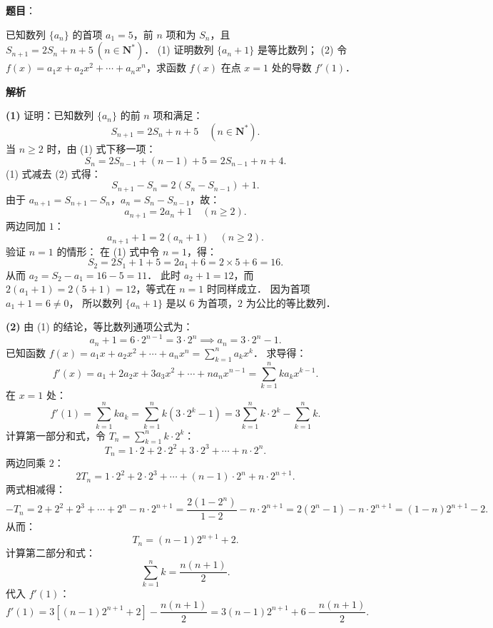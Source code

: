 \begin{answer}

\textbf{题目}：

已知数列 $\{a_n\}$ 的首项 $a_1 = 5$，前 $n$ 项和为 $S_n$，且 $S_{n+1} = 2S_n + n + 5\ (n \in \mathbf{N}^*)$．
(1) 证明数列 $\{a_n + 1\}$ 是等比数列；
(2) 令 $f(x) = a_1 x + a_2 x^2 + \cdots + a_n x^n$，求函数 $f(x)$ 在点 $x = 1$ 处的导数 $f'(1)$．

\textbf{解析}

\textbf{(1)}
证明：已知数列 $\{a_n\}$ 的前 $n$ 项和满足：
\nopagebreak[4]
\[
S_{n+1} = 2S_n + n + 5 \quad (n \in \mathbf{N}^*). \tag{1}
\]
当 $n \geqslant 2$ 时，由 (1) 式下移一项：
\nopagebreak[4]
\[
S_n = 2S_{n-1} + (n - 1) + 5 = 2S_{n-1} + n + 4. \tag{2}
\]
(1) 式减去 (2) 式得：
\nopagebreak[4]
\[
S_{n+1} - S_n = 2(S_n - S_{n-1}) + 1.
\]
由于 $a_{n+1} = S_{n+1} - S_n$，$a_n = S_n - S_{n-1}$，故：
\nopagebreak[4]
\[
a_{n+1} = 2a_n + 1 \quad (n \geqslant 2).
\]
两边同加 $1$：
\nopagebreak[4]
\[
a_{n+1} + 1 = 2(a_n + 1) \quad (n \geqslant 2).
\]
验证 $n = 1$ 的情形：
在 (1) 式中令 $n = 1$，得：
\nopagebreak[4]
\[
S_2 = 2S_1 + 1 + 5 = 2a_1 + 6 = 2 \times 5 + 6 = 16.
\]
从而 $a_2 = S_2 - a_1 = 16 - 5 = 11$．
此时 $a_2 + 1 = 12$，而 $2(a_1 + 1) = 2(5 + 1) = 12$，等式在 $n = 1$ 时同样成立．
因为首项 $a_1 + 1 = 6 \neq 0$，
所以数列 $\{a_n + 1\}$ 是以 $6$ 为首项，$2$ 为公比的等比数列．

\textbf{(2)}
由 (1) 的结论，等比数列通项公式为：
\nopagebreak[4]
\[
a_n + 1 = 6 \cdot 2^{n-1} = 3 \cdot 2^n \implies a_n = 3 \cdot 2^n - 1.
\]
已知函数 $f(x) = a_1 x + a_2 x^2 + \cdots + a_n x^n = \sum_{k=1}^n a_k x^k$．
求导得：
\nopagebreak[4]
\[
f'(x) = a_1 + 2a_2 x + 3a_3 x^2 + \cdots + n a_n x^{n-1} = \sum_{k=1}^n k a_k x^{k-1}.
\]
在 $x = 1$ 处：
\nopagebreak[4]
\[
f'(1) = \sum_{k=1}^n k a_k = \sum_{k=1}^n k (3 \cdot 2^k - 1) = 3 \sum_{k=1}^n k \cdot 2^k - \sum_{k=1}^n k.
\]
计算第一部分和式，令 $T_n = \sum_{k=1}^n k \cdot 2^k$：
\nopagebreak[4]
\[
T_n = 1 \cdot 2 + 2 \cdot 2^2 + 3 \cdot 2^3 + \cdots + n \cdot 2^n.
\]
两边同乘 $2$：
\nopagebreak[4]
\[
2T_n = 1 \cdot 2^2 + 2 \cdot 2^3 + \cdots + (n-1) \cdot 2^n + n \cdot 2^{n+1}.
\]
两式相减得：
\nopagebreak[4]
\[
-T_n = 2 + 2^2 + 2^3 + \cdots + 2^n - n \cdot 2^{n+1} = \dfrac{2(1 - 2^n)}{1 - 2} - n \cdot 2^{n+1} = 2(2^n - 1) - n \cdot 2^{n+1} = (1 - n)2^{n+1} - 2.
\]
从而：
\nopagebreak[4]
\[
T_n = (n - 1)2^{n+1} + 2.
\]
计算第二部分和式：
\nopagebreak[4]
\[
\sum_{k=1}^n k = \dfrac{n(n+1)}{2}.
\]
代入 $f'(1)$：
\nopagebreak[4]
\[
f'(1) = 3\left[(n - 1)2^{n+1} + 2\right] - \dfrac{n(n+1)}{2} = 3(n - 1)2^{n+1} + 6 - \dfrac{n(n+1)}{2}.
\]



\end{answer}
